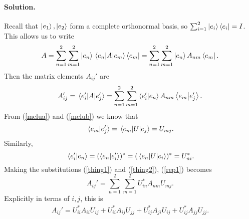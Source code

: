 \documentclass[11pt]{article}
\newcommand{\refeq}[1]{(\ref{#1})}
\newenvironment{solution}
{
    \paragraph{Solution.}
    \ignorespaces
}
{
    \bigskip
}
\begin{document}
\begin{solution}
	Recall that $\ket{e_1}, \ket{e_2}$ form a complete orthonormal basis, so $\sum_{i=1}^2 \ket{e_i}\bra{e_i} = I$.  This allows us to write
	\begin{equation}
		A = \sum_{n=1}^2 \sum_{m=1}^2 \ket{e_n} \mel{e_n}{A}{e_m} \bra{e_m} = \sum_{n=1}^2 \sum_{m=1}^2 \ket{e_n} A_{nm} \bra{e_m}.
	\end{equation}
	Then the matrix elements $A_{ij}'$ are
	\begin{equation} \label{rep1}
		A_{ij}' = \mel*{e_i'}{A}{e_j'} = \sum_{n=1}^2 \sum_{m=1}^2 \braket{e_i'}{e_n} A_{nm} \braket{e_m}{e_j'}.
	\end{equation}
	From \refeq{melua} and \refeq{melub} we know that
	\begin{equation} \label{thing1}
		\braket*{e_m}{e_j'} = \mel{e_m}{U}{e_j} = U_{mj}.
	\end{equation}
	Similarly,
	\begin{equation} \label{thing2}
		\braket*{e_i'}{e_n} = (\braket{e_n}{e_i'})^* = (\mel{e_n}{U}{e_i})^* = U^*_{ni}.
	\end{equation}
	Making the substitutions \refeq{thing1} and \refeq{thing2}, \refeq{rep1} becomes
	\begin{equation}
		A_{ij}' = \sum_{n=1}^2 \sum_{m=1}^2 U_{in}^* A_{nm} U_{mj}.
	\end{equation}
	Explicitly in terms of $i, j$, this is
	\begin{align}
		A_{ij}' = U_{ii}^* A_{ii} U_{ij} + U_{ii}^* A_{ij} U_{jj} + U_{ij}^* A_{ji} U_{ij} + U_{ij}^* A_{jj} U_{jj}.
	\end{align}

\end{solution}
\end{document}
